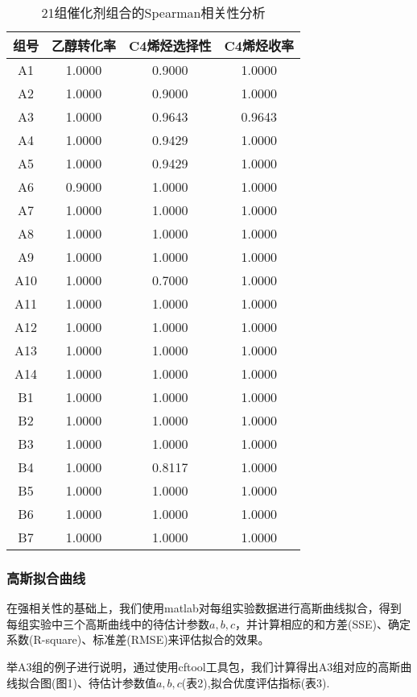 \documentclass[withoutpreface,bwprint]{cumcmthesis} %
\begin{document}
\begin{table}[!htbp]
	\caption{21组催化剂组合的Spearman相关性分析}\label{tab:001} \centering
	\begin{tabular}{cccc}
		\toprule[1.5pt]
		组号& 乙醇转化率 & C4烯烃选择性 & C4烯烃收率 \\
		\midrule[1pt]
		A1 & 1.0000 & 0.9000 & 1.0000\\
		A2 & 1.0000 & 0.9000 & 1.0000\\
		A3 & 1.0000 & 0.9643 & 0.9643\\
		A4 & 1.0000 & 0.9429 & 1.0000\\
		A5 & 1.0000 & 0.9429 & 1.0000\\
		A6 & 0.9000 & 1.0000 & 1.0000\\
		A7 & 1.0000 & 1.0000 & 1.0000\\
		A8 & 1.0000 & 1.0000 & 1.0000\\
		A9 & 1.0000 & 1.0000 & 1.0000\\
		A10 & 1.0000 & 0.7000 & 1.0000\\
		A11 & 1.0000 & 1.0000 & 1.0000\\
		A12 & 1.0000 & 1.0000 & 1.0000\\
		A13 & 1.0000 & 1.0000 & 1.0000\\
		A14 & 1.0000 & 1.0000 & 1.0000\\
		B1 & 1.0000 & 1.0000 & 1.0000\\		
		B2 & 1.0000 & 1.0000 & 1.0000\\	
		B3 & 1.0000 & 1.0000 & 1.0000\\	
		B4 & 1.0000 & 0.8117 & 1.0000\\	
		B5 & 1.0000 & 1.0000 & 1.0000\\	
		B6 & 1.0000 & 1.0000 & 1.0000\\	
		B7 & 1.0000 & 1.0000 & 1.0000\\		
		\bottomrule[1.5pt]
	\end{tabular}
\end{table}

\subsubsection{高斯拟合曲线}
在强相关性的基础上，我们使用matlab对每组实验数据进行高斯曲线拟合，得到每组实验中三个高斯曲线中的待估计参数$a,b,c$，并计算相应的和方差(SSE)、确定系数(R-square)、标准差(RMSE)来评估拟合的效果。

举A3组的例子进行说明，通过使用cftool工具包，我们计算得出A3组对应的高斯曲线拟合图(图1)、待估计参数值$a,b,c$(表2),拟合优度评估指标(表3).
\end{document}
